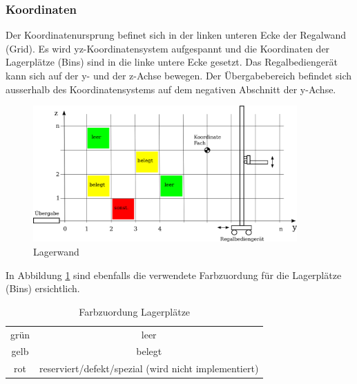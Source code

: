 \subsubsection{Koordinaten}
Der Koordinatenursprung befinet sich in der linken unteren Ecke der Regalwand (Grid). Es wird yz-Koordinatensystem aufgespannt und die Koordinaten der Lagerplätze (Bins) sind in die linke untere Ecke gesetzt. Das Regalbediengerät kann sich auf der y- und der z-Achse bewegen. Der Übergabebereich befindet sich ausserhalb des Koordinatensystems auf dem negativen Abschnitt der y-Achse. 
%
\begin{figure}[h]
  \begin{center}
    \includegraphics[width=0.9\textwidth]{images/koordinaten-wand.png}
    \caption{Lagerwand}
    \label{fig:wand}
  \end{center}
\end{figure}
%
In Abbildung \ref{fig:wand} sind ebenfalls die verwendete Farbzuordung für die Lagerplätze (Bins) ersichtlich.
%
\begin{table}
  \caption{Farbzuordung Lagerplätze}
  \label{tab:bin-color}

  \begin{center}
    \begin{tabular}{cc}
       grün & leer\\
       gelb & belegt\\
       rot & reserviert/defekt/spezial (wird nicht implementiert) \\
    \end{tabular}
  \end{center}
\end{table}

%
